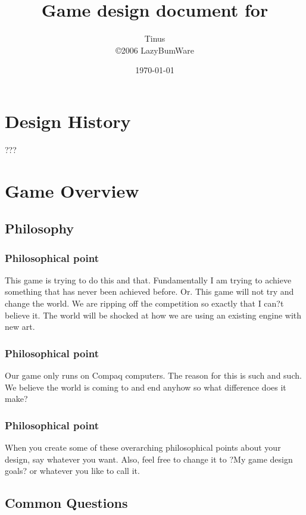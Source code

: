 \documentclass[a4paper]{report}
\title{
	Game design document for \\ 
	\nadruk{The Scattered Lands}
}
\author{
	Tinus \\
	\copyright 2006 LazyBumWare
}
\date{\today}
\begin{document}
\maketitle
\tableofcontents




\chapter{Design History}

	???


\chapter{Game Overview}

	\section{Philosophy}

		\subsection{Philosophical point}

			This game is trying to do this and that.  Fundamentally I am trying to achieve something that has never been achieved before.  Or.  This game will not try and change the world.  We are ripping off the competition so exactly that I can?t believe it.  The world will be shocked at how we are using an existing engine with new art.

		\subsection{Philosophical point}

			Our game only runs on Compaq computers.  The reason for this is such and such.  We believe the world is coming to and end anyhow so what difference does it make?

		\subsection{Philosophical point}

			When you create some of these overarching philosophical points about your design, say whatever you want.  Also, feel free to change it to ?My game design goals? or whatever you like to call it.

	\section{Common Questions}
\end{document}
